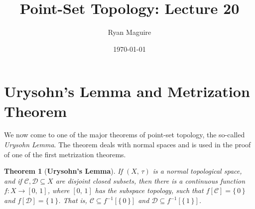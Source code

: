 \documentclass{article}
\title{Point-Set Topology: Lecture 20}
\author{Ryan Maguire}
\date{\today}
\theoremstyle{plain}
\newtheorem{theorem}{Theorem}[section]
\begin{document}
    \maketitle
    \section{Urysohn's Lemma and Metrization Theorem}
        We now come to one of the major theorems of point-set topology, the
        so-called \textit{Urysohn Lemma}. The theorem deals with normal spaces
        and is used in the proof of one of the first metrization theorems.
        \begin{theorem}[\textbf{Urysohn's Lemma}]
            If $(X,\,\tau)$ is a normal topological space, and if
            $\mathcal{C},\mathcal{D}\subseteq{X}$ are disjoint closed subsets,
            then there is a continuous function
            $f:X\rightarrow[0,\,1]$, where $[0,\,1]$ has the subspace topology,
            such that $f[\mathcal{C}]=\{\,0\,\}$ and
            $f[\mathcal{D}]=\{\,1\,\}$. That is,
            $\mathcal{C}\subseteq{f}^{-1}[\{\,0\,\}]$ and
            $\mathcal{D}\subseteq{f}^{-1}[\{\,1\,\}]$.
        \end{theorem}
\end{document}

